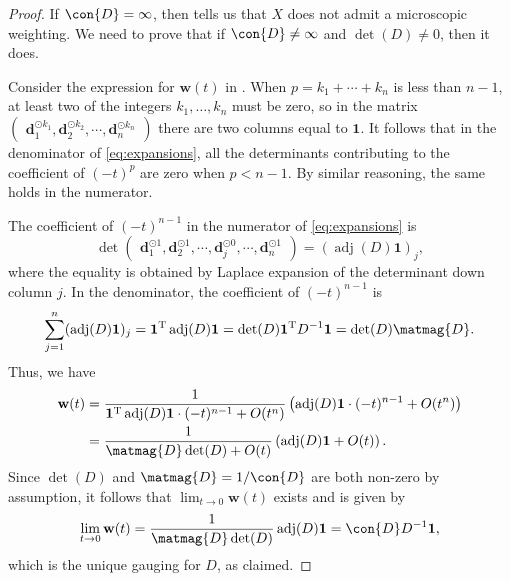 \documentclass[a4paper, oneside, reqno]{amsart}
\theoremstyle{definition}
\theoremstyle{remark}
\numberwithin{equation}{section}
\DeclareMathOperator{\adj}{adj}
\renewcommand{\vec}{\mathbf}
\newcommand{\onevector}{\mathbf{1}}
\newcommand{\transpose}{\mathrm{T}}
\begin{document}
\begin{proof}
    If \(\con{D} = \infty\), then  tells us that \(X\) does not admit a microscopic weighting. We need to prove that if \(\con{D} \neq \infty\) and \(\det(D) \neq 0\), then it does.

    Consider the expression for \(\vec{w}(t)\) in . When \(p = k_1 + \cdots + k_n\) is less than \(n-1\), at least two of the integers \(k_1,\ldots, k_n\) must be zero, so in the matrix
    \(\begin{pmatrix}
    \vec{d}_1^{\odot k_1},
    \vec{d}_2^{\odot k_2},
    \cdots,
    \vec{d}_n^{\odot k_n}
    \end{pmatrix}\)
    there are two columns equal to \(\onevector\). It follows that in the denominator of \eqref{eq:expansions}, all the determinants contributing to the coefficient of \((-t)^p\) are zero when \(p < n-1\). By similar reasoning, the same holds in the numerator.

    The coefficient of \((-t)^{n-1}\) in the numerator of \eqref{eq:expansions} is
    \begin{equation}
    \label{eq:adj_one_j}
        \det
        \begin{pmatrix}
        \vec{d}_1^{\odot 1},
        \vec{d}_2^{\odot 1},
        \cdots,
        \vec{d}_j^{\odot 0},
        \cdots,
        \vec{d}_n^{\odot 1}
        \end{pmatrix} =
        (\adj(D) \onevector)_j, 
    \end{equation}
    where the equality is obtained by Laplace expansion of the determinant down column \(j\). In the denominator, the coefficient of \((-t)^{n-1}\) is 
    \begin{equation}
    \label{eq:Fn_detmag}
        \sum_{j=1}^n (\adj(D) \onevector)_j = \onevector^\transpose \adj(D) \onevector = \det(D) \onevector^\transpose D^{-1} \onevector = \det(D)\matmag{D}.
    \end{equation}
    Thus, we have
    \begin{align*}
        \vec{w}(t) 
        &= 
        \frac{1}{\onevector^\transpose \adj(D)\onevector \cdot (-t)^{n-1} + O(t^n)}
        \left(\adj(D)
        \onevector \cdot (-t)^{n-1}
        +O(t^n)\right)
        \\
        &= \frac{1}{\matmag{D}\det(D) + O(t)}
        \left(\adj(D)
        \onevector
        +O(t)\right).
    \end{align*}
    Since \(\det(D)\) and \(\matmag{D} = 1/\con{D}\) are both non-zero by assumption, it follows that \(\lim_{t \to 0} \vec{w}(t)\) exists and is given by
    \[\lim_{t \to 0} \vec{w}(t) = \frac{1}{\matmag{D} \det(D)} \adj(D) \onevector = \con{D} D^{-1} \onevector,\]
    which is the unique gauging for \(D\), as claimed.
\end{proof}
\end{document}
